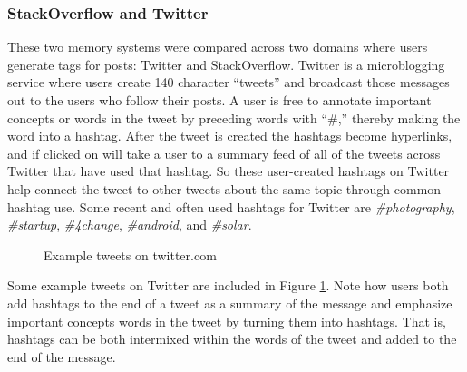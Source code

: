 \documentclass[man,floatsintext,donotrepeattitle]{apa6}
\begin{document}
\subsubsection{StackOverflow and Twitter}

These two memory systems were compared across two domains where users generate tags for posts: Twitter and StackOverflow.
Twitter is a microblogging service where users create 140 character ``tweets'' and broadcast those messages out to the users who follow their posts.
A user is free to annotate important concepts or words in the tweet by preceding words with ``\#,'' thereby making the word into a hashtag.
After the tweet is created the hashtags become hyperlinks, and if clicked on will take a user to a summary feed of all of the tweets across Twitter that have used that hashtag.
So these user-created hashtags on Twitter help connect the tweet to other tweets about the same topic through common hashtag use.
Some recent and often used hashtags for Twitter are \emph{\#photography}, \emph{\#startup}, \emph{\#4change}, \emph{\#android}, and \emph{\#solar}.

\begin{figure}[!htbp]
  {%
    \setlength{\fboxsep}{0pt}%
    \setlength{\fboxrule}{1pt}%
    \hfill
    \hfill
    \hfill
    \vfill
    \hfill
    \hfill
    \hfill
    \caption{Example tweets on twitter.com}
    \label{figTweetExample}
  }%
\end{figure}

Some example tweets on Twitter are included in Figure \ref{figTweetExample}.
Note how users both add hashtags to the end of a tweet as a summary of the message and emphasize important concepts words in the tweet by turning them into hashtags.
That is, hashtags can be both intermixed within the words of the tweet and added to the end of the message.
\end{document}
